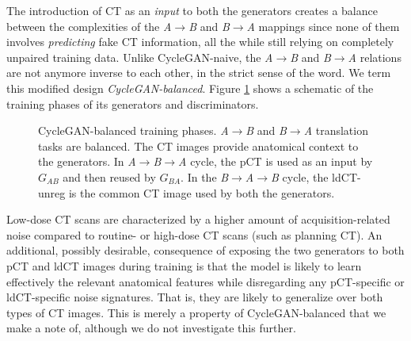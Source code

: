 The introduction of CT as an \textit{input} to both the generators creates a balance between the complexities of the \textit{A}$\rightarrow$\textit{B} and \textit{B}$\rightarrow$\textit{A} mappings since none of them involves \textit{predicting} fake CT information, all the while still relying on completely unpaired training data. Unlike CycleGAN-naive, the \textit{A}$\rightarrow$\textit{B} and \textit{B}$\rightarrow$\textit{A} relations are not anymore inverse to each other, in the strict sense of the word. We term this modified design \textit{CycleGAN-balanced}. Figure \ref{fig:cyclegan_balanced} shows a schematic of the training phases of its generators and discriminators.

\begin{figure}[h!]
    \centering
    \caption{CycleGAN-balanced training phases. \textit{A}$\rightarrow$\textit{B} and \textit{B}$\rightarrow$\textit{A} translation tasks are balanced. The CT images provide anatomical context to the generators. In \textit{A}$\rightarrow$\textit{B}$\rightarrow$\textit{A} cycle, the pCT is used as an input by $G_{AB}$ and then reused by $G_{BA}$. In the \textit{B}$\rightarrow$\textit{A}$\rightarrow$\textit{B} cycle, the ldCT-unreg is the common CT image used by both the generators.}
    \label{fig:cyclegan_balanced}
\end{figure}{}

Low-dose CT scans are characterized by a higher amount of acquisition-related noise compared to routine- or high-dose CT scans (such as planning CT). An additional, possibly desirable, consequence of exposing the two generators to both pCT and ldCT images during training is that the model is likely to learn effectively the relevant anatomical features while disregarding any pCT-specific or ldCT-specific noise signatures. That is, they are likely to generalize over both types of CT images. This is merely a property of CycleGAN-balanced that we make a note of, although we do not investigate this further.


